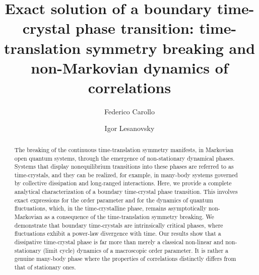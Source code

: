 \documentclass[prl,superscriptaddress,showpacs,longbibliography,reprint]{revtex4-2}
\begin{document}
\title{Exact solution  of a boundary time-crystal phase transition: time-translation symmetry breaking and non-Markovian dynamics of correlations}
\author{Federico Carollo}
\author{Igor Lesanovsky}


\begin{abstract}
The breaking of the continuous time-translation symmetry manifests, in Markovian open quantum systems, through the emergence of non-stationary dynamical phases. Systems that display nonequilibrium transitions into these phases are referred to as time-crystals, and they can be realized, for example, in many-body systems governed by collective dissipation and long-ranged interactions. Here, we provide a complete analytical characterization of a boundary time-crystal phase transition. This involves exact expressions for the order parameter and for the dynamics of quantum fluctuations, which, in the time-crystalline phase,  remains asymptotically non-Markovian as a consequence of the time-translation symmetry breaking. We demonstrate that boundary time-crystals are intrinsically critical phases, where fluctuations exhibit a power-law divergence with time. Our results show that a dissipative time-crystal phase is far more than merely a classical non-linear and non-stationary (limit cycle) dynamics of a macroscopic order parameter. It is rather a genuine many-body phase where the properties of correlations distinctly differs from that of stationary ones. 
\end{abstract}

\maketitle
\end{document}
